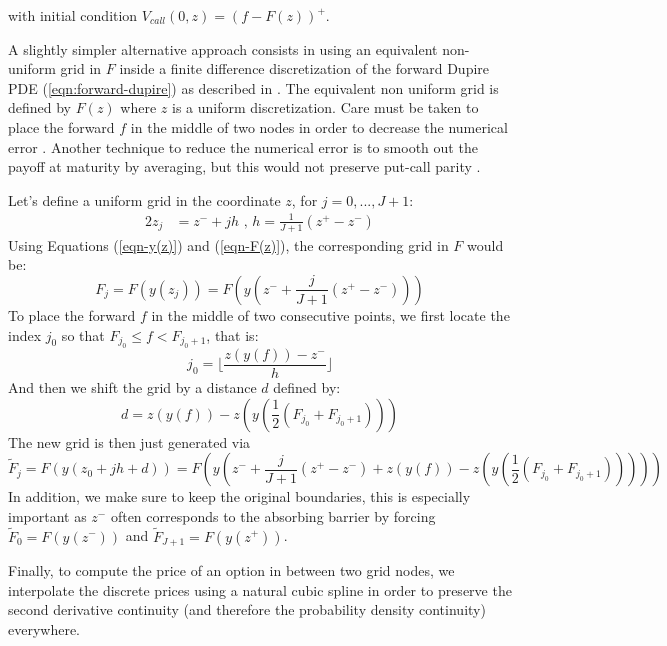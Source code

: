 \documentclass[]{rAMF2e}
\begin{document}
with initial condition $V_{call}(0, z) = (f - F(z))^+$.

A slightly simpler alternative approach consists in using an equivalent non-uniform grid in $F$ inside a finite difference discretization of the forward Dupire PDE (\ref{eqn:forward-dupire}) as described in \citep{andersen2010interest}. The equivalent non uniform grid is defined by $F(z)$ where $z$ is a uniform discretization. Care must be taken to place the forward $f$ in the middle of two nodes in order to decrease the numerical error \citep{tavella-pricing}. Another technique to reduce the numerical error is to smooth out the payoff at maturity by averaging, but this would not preserve put-call parity \citep{lefloch2013exacttr}.

Let's define a uniform grid in the coordinate $z$, for $j=0,...,J+1$:
\begin{alignat}{2}
z_j &= z^{-} + j h \text{ , } h = \frac{1}{J+1}(z^{+}-z^{-})
\end{alignat}
Using Equations (\ref{eqn-y(z)}) and (\ref{eqn-F(z)}), the corresponding grid in $F$ would be:
\begin{equation}
F_j = F\left(y(z_j)\right)  = F\left( y\left(z^{-} + \frac{j}{J+1}\left(z^{+}-z^{-}\right)\right)  \right)
\end{equation}
To place the forward $f$ in the middle of two consecutive points, we first locate the index $j_0$ so that 
$F_{j_0} \leq f < F_{j_0 + 1}$, that is:
\begin{equation}
j_0 = \lfloor\frac{z(y(f)) - z^{-}}{h}\rfloor
\end{equation}
And then we shift the grid by a distance $d$ defined by:
\begin{equation}
d = z(y(f))  - z(y\left(\frac{1}{2}(F_{j_0}+F_{j_0+1})\right))
\end{equation}
The new grid is then just generated via 
\begin{equation}
\tilde{F}_j = F(y(z_{0}+ j h + d)) = F(y( z^{-} + \frac{j}{J+1}\left(z^{+}-z^{-}\right) + z(y(f))  - z(y\left(\frac{1}{2}(F_{j_0}+F_{j_0+1})\right)) )) 
\end{equation}
In addition, we make sure to keep the original boundaries, this is especially important as $z^{-}$ often corresponds to the absorbing barrier by forcing $\tilde{F}_0 = F(y(z^{-}))$ and $\tilde{F}_{J+1} = F(y(z^{+}))$.

Finally, to compute the price of an option in between two grid nodes, we interpolate the discrete prices using a natural cubic spline in order to preserve the second derivative continuity (and therefore the probability density continuity) everywhere.
 
\end{document}
